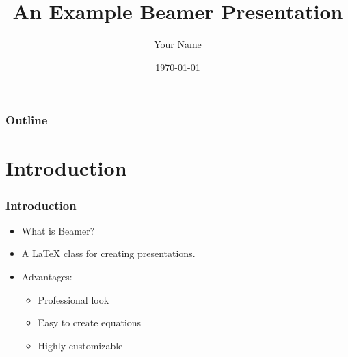 \documentclass{cls/simplebeamer}
\title{An Example Beamer Presentation}
\author{Your Name}
\date{\today}
\begin{document}
\begin{frame}
  \titlepage
\end{frame}

\begin{frame}
  \frametitle{Outline}
  \tableofcontents
\end{frame}

\section{Introduction}

\begin{frame}
  \frametitle{Introduction}
  \begin{itemize}
    \item What is Beamer?
    \item A LaTeX class for creating presentations.
    \item Advantages:
      \begin{itemize}
        \item Professional look
        \item Easy to create equations
        \item Highly customizable
      \end{itemize}
  \end{itemize}
\end{frame}
\end{document}
